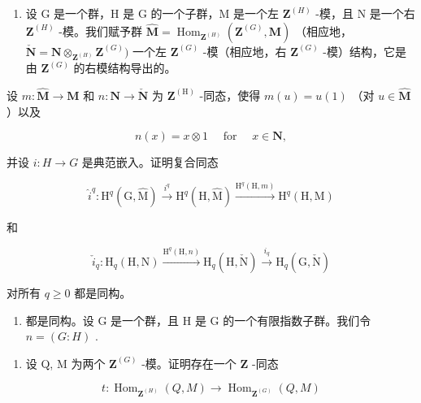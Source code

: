 \begin{enumerate}
\def\labelenumi{\arabic{enumi})}
\setcounter{enumi}{12}
\tightlist
\item
  设 G 是一个群，H 是 G 的一个子群，M 是一个左 \(\mathbf{Z}^{(H)}\) -模，且 N 是一个右 \(\mathbf{Z}^{(H)}\) -模。我们赋予群 \(\hat{\mathbf{M}} = \operatorname{Hom}_{\mathbf{Z}^{(H)}} (\mathbf{Z}^{(G)}, \mathbf{M})\) （相应地， \(\check{\mathbf{N}} = \mathbf{N} \otimes_{\mathbf{Z}^{(H)}} \mathbf{Z}^{(G)})\) 一个左 \(\mathbf{Z}^{(G)}\) -模（相应地，右 \(\mathbf{Z}^{(G)}\) -模）结构，它是由 \(\mathbf{Z}^{(G)}\) 的右模结构导出的。
\end{enumerate}

设 \(m:\hat{\mathbf{M}}\to \mathbf{M}\) 和 \(n:\mathbf{N}\rightarrow \check{\mathbf{N}}\) 为 \(\mathbf{Z}^{(\mathrm{H})}\) -同态，使得 \(m(u) = u(1)\) （对 \(u\in \hat{\mathbf{M}}\) ）以及

\[
n (x) = x \otimes 1 \quad \text { for } \quad x \in \mathbf {N}  ,
\]

并设 \(i: H \to G\) 是典范嵌入。证明复合同态

\[
\hat {i} ^ {q}: \mathrm{H} ^ {q} (\mathrm{G}, \hat {\mathrm{M}}) \xrightarrow {i ^ {q}} \mathrm{H} ^ {q} (\mathrm{H}, \hat {\mathrm{M}}) \xrightarrow {\mathrm{H} ^ {q} (\mathrm{H} , m)} \mathrm{H} ^ {q} (\mathrm{H}, \mathrm{M})
\]

和

\[
\check {i} _ {q}: \mathrm{H} _ {q} (\mathrm{H}, \mathrm{N}) \xrightarrow {\mathrm{H} ^ {q} (\mathrm{H} , n)} \mathrm{H} _ {q} (\mathrm{H}, \check {\mathrm{N}}) \xrightarrow {i _ {q}} \mathrm{H} _ {q} (\mathrm{G}, \check {\mathrm{N}})
\]

对所有 \(q \geqslant 0\) 都是同构。

\begin{enumerate}
\def\labelenumi{\arabic{enumi})}
\setcounter{enumi}{13}
\tightlist
\item
  都是同构。设 G 是一个群，且 H 是 G 的一个有限指数子群。我们令 \(n = (G:H)\) .
\end{enumerate}

\begin{enumerate}
\def\labelenumi{\alph{enumi})}
\tightlist
\item
  设 Q, M 为两个 \(\mathbf{Z}^{(G)}\) -模。证明存在一个 \(\mathbf{Z}\) -同态
\end{enumerate}

\[
t: \operatorname{Hom} _ {\mathbf {Z} ^ {(H)}} (Q, M) \rightarrow \operatorname{Hom} _ {\mathbf {Z} ^ {(G)}} (Q, M)
\]

